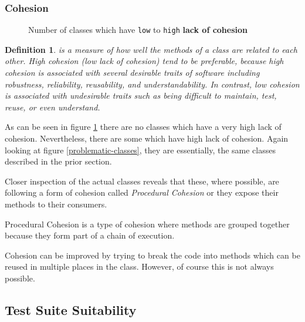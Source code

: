 \documentclass[12pt]{article}
\DeclareRobustCommand{\ul}[1]{%
	\uline{\phantom{#1}}%
	\llap{\contour{white}{#1}}%
}
\newtheorem*{definition}{Definition}
\begin{document}
\subsubsection{Cohesion}

\begin{figure}[H]
    \centering
    \caption{Number of classes which have \texttt{low} to
    \texttt{high} \textbf{lack of cohesion}}
    \label{cohesion-diag}
\end{figure}

\begin{definition}
    \ul{Cohesion} is a measure of how well the methods of
    a class are related to each other. High cohesion (low lack
    of cohesion) tend to be preferable, because high cohesion is
    associated with several desirable traits of software
    including robustness, reliability, reusability, and
    understandability. In contrast, low cohesion is associated
    with undesirable traits such as being difficult to maintain,
    test, reuse, or even understand.
\end{definition}

As can be seen in figure \ref{cohesion-diag} there are no classes
which have a very high lack of cohesion. Nevertheless, there are
some which have high lack of cohesion. Again looking at
figure \ref{problematic-classes}, they are essentially, the same
classes described in the prior section.

Closer inspection of the actual classes reveals that these,
where possible, are following a form of cohesion called
\emph{Procedural Cohesion} or they expose their methods to their
consumers.

Procedural Cohesion is a type of cohesion where methods are
grouped together because they form part of a chain of execution.

Cohesion can be improved by trying to break the code into
methods which can be reused in multiple places in the class.
However, of course this is not always possible.

\subsection{Test Suite Suitability}
\end{document}
